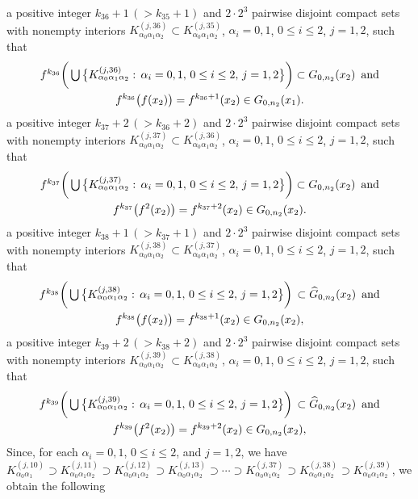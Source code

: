 \documentclass[12pt]{article}
\newcommand{\al}{\alpha}
\begin{document}
\noindent a positive integer $k_{36}+1 \, (> k_{35}+1)$ and $2 \cdot 2^3$ pairwise disjoint compact sets with nonempty interiors $K_{\al_0\al_1\al_2}^{(j,36)} \subset K_{\al_0\al_1\al_2}^{(j,35)}$, $\al_i = 0, 1$, $0 \le i \le 2$, $j = 1, 2$, such that 
\begin{multline*}
$$
f^{k_{36}}\bigg(\bigcup \big\{ K_{\al_0\al_1\al_2}^{(j,36)}: \, \al_i = 0, 1, \, 0 \le i \le 2, \, j = 1, 2 \big\}\bigg) \subset G_{0,n_2}(x_2) \,\,\, \text{and} \\
f^{k_{36}}\big(f(x_2)\big) = f^{k_{36}+1}(x_2) \in G_{0,n_2}(x_1).
$$
\end{multline*}
a positive integer $k_{37}+2 \, (> k_{36}+2)$ and $2 \cdot 2^3$ pairwise disjoint compact sets with nonempty interiors $K_{\al_0\al_1\al_2}^{(j,37)} \subset K_{\al_0\al_1\al_2}^{(j,36)}$, $\al_i = 0, 1$, $0 \le i \le 2$, $j = 1, 2$, such that 
\begin{multline*}
$$
f^{k_{37}}\bigg(\bigcup \big\{ K_{\al_0\al_1\al_2}^{(j,37)}: \, \al_i = 0, 1, \, 0 \le i \le 2, \, j = 1, 2 \big\}\bigg) \subset G_{0,n_2}(x_2) \,\,\, \text{and} \\
f^{k_{37}}\big(f^2(x_2)\big) = f^{k_{37}+2}(x_2) \in G_{0,n_2}(x_2).
$$
\end{multline*}
a positive integer $k_{38}+1 \, (> k_{37}+1)$ and $2 \cdot 2^3$ pairwise disjoint compact sets with nonempty interiors $K_{\al_0\al_1\al_2}^{(j,38)} \subset K_{\al_0\al_1\al_2}^{(j,37)}$, $\al_i = 0, 1$, $0 \le i \le 2$, $j = 1, 2$, such that 
\begin{multline*}
$$
f^{k_{38}}\bigg(\bigcup \big\{ K_{\al_0\al_1\al_2}^{(j,38)}: \, \al_i = 0, 1, \, 0 \le i \le 2, \, j = 1, 2 \big\}\bigg) \, \subset \widehat G_{0,n_2}(x_2) \,\,\, \text{and} \\
f^{k_{38}}\big(f(x_2)\big) = f^{k_{38}+1}(x_2) \in G_{0,n_2}(x_2),
$$
\end{multline*}
a positive integer $k_{39}+2 \, (> k_{38}+2)$ and $2 \cdot 2^3$ pairwise disjoint compact sets with nonempty interiors $K_{\al_0\al_1\al_2}^{(j,39)} \subset K_{\al_0\al_1\al_2}^{(j,38)}$, $\al_i = 0, 1$, $0 \le i \le 2$, $j = 1, 2$, such that 
\begin{multline*}
$$
f^{k_{39}}\bigg(\bigcup \big\{ K_{\al_0\al_1\al_2}^{(j,39)}: \, \al_i = 0, 1, \, 0 \le i \le 2, \, j = 1, 2 \big\}\bigg) \, \subset \widehat G_{0,n_2}(x_2) \,\,\, \text{and} \\
f^{k_{39}}\big(f^2(x_2)\big) = f^{k_{39}+2}(x_2) \in G_{0,n_2}(x_2),
$$
\end{multline*}
\indent Since, for each $\al_i = 0, 1$, $0 \le i \le 2$, and $j = 1, 2$, we have $K_{\al_0\al_1}^{(j,10)} \supset K_{\al_0\al_1\al_2}^{(j,11)} \supset K_{\al_0\al_1\al_2}^{(j,12)} \supset K_{\al_0\al_1\al_2}^{(j,13)} \supset \cdots \supset K_{\al_0\al_1\al_2}^{(j,37)} \supset K_{\al_0\al_1\al_2}^{(j,38)} \supset K_{\al_0\al_1\al_2}^{(j,39)}$, we obtain the following  
\end{document}
